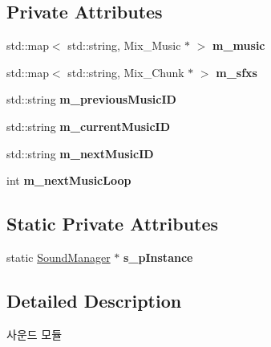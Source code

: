 \subsection*{Private Attributes}
\begin{DoxyCompactItemize}
\item 
\mbox{\label{class_sound_manager_ab57fd7c604471e90e78af9ef99b7171d}} 
std\+::map$<$ std\+::string, Mix\+\_\+\+Music $\ast$ $>$ {\bfseries m\+\_\+music}
\item 
\mbox{\label{class_sound_manager_a002bacf2ea6c35ff9ae240bc28c642aa}} 
std\+::map$<$ std\+::string, Mix\+\_\+\+Chunk $\ast$ $>$ {\bfseries m\+\_\+sfxs}
\item 
\mbox{\label{class_sound_manager_a72b06f884d3c21c7255cce20656cff47}} 
std\+::string {\bfseries m\+\_\+previous\+Music\+ID}
\item 
\mbox{\label{class_sound_manager_a8019deda071850d6f1b13c74e5bbce42}} 
std\+::string {\bfseries m\+\_\+current\+Music\+ID}
\item 
\mbox{\label{class_sound_manager_af9ad6878f96cb0e0d246c3ea8a9e2df7}} 
std\+::string {\bfseries m\+\_\+next\+Music\+ID}
\item 
\mbox{\label{class_sound_manager_a040a613d5edc40c6d34ede1f9d661ef5}} 
int {\bfseries m\+\_\+next\+Music\+Loop}
\end{DoxyCompactItemize}
\subsection*{Static Private Attributes}
\begin{DoxyCompactItemize}
\item 
\mbox{\label{class_sound_manager_aad8c40bed5309488aaad5ccad8c83029}} 
static \mbox{\hyperlink{class_sound_manager}{Sound\+Manager}} $\ast$ {\bfseries s\+\_\+p\+Instance}
\end{DoxyCompactItemize}


\subsection{Detailed Description}
사운드 모듈 

